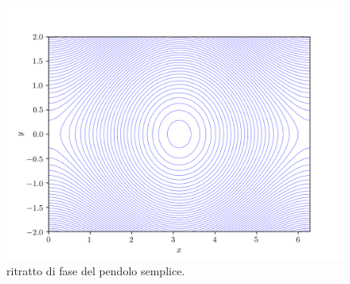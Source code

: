 \begin{example}
	\iffigureon
	\begin{figure}
		\centering
		\includegraphics{img/standard-map/fase-pendolo}
		\caption{ritratto di fase del pendolo semplice.}
		\label{fig:pendolo-fase}
	\end{figure}
	

\end{example}
